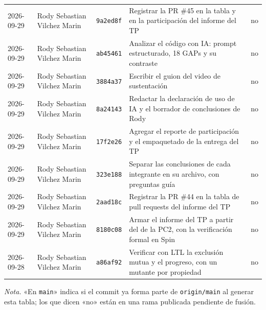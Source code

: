 {\begin{xltabular}{\textwidth}{@{}L{1.9cm}L{2.7cm}L{1.4cm}Yc@{}}
2026-09-29 & Rody Sebastian Vilchez Marin & \texttt{9a2ed8f} & Registrar la PR \#45 en la tabla y en la participación del informe del TP & no \\
2026-09-29 & Rody Sebastian Vilchez Marin & \texttt{ab45461} & Analizar el código con IA: prompt estructurado, 18 GAPs y su contraste & no \\
2026-09-29 & Rody Sebastian Vilchez Marin & \texttt{3884a37} & Escribir el guion del video de sustentación & no \\
2026-09-29 & Rody Sebastian Vilchez Marin & \texttt{8a24143} & Redactar la declaración de uso de IA y el borrador de conclusiones de Rody & no \\
2026-09-29 & Rody Sebastian Vilchez Marin & \texttt{17f2e26} & Agregar el reporte de participación y el empaquetado de la entrega del TP & no \\
2026-09-29 & Rody Sebastian Vilchez Marin & \texttt{323e188} & Separar las conclusiones de cada integrante en su archivo, con preguntas guía & no \\
2026-09-29 & Rody Sebastian Vilchez Marin & \texttt{2aad18c} & Registrar la PR \#44 en la tabla de pull requests del informe del TP & no \\
2026-09-29 & Rody Sebastian Vilchez Marin & \texttt{8180c08} & Armar el informe del TP a partir del de la PC2, con la verificación formal en Spin & no \\
2026-09-28 & Rody Sebastian Vilchez Marin & \texttt{a86af92} & Verificar con LTL la exclusión mutua y el progreso, con un mutante por propiedad & no \\
\end{xltabular}
}

{\footnotesize\textit{Nota.} «En \texttt{main}» indica si el commit ya forma parte de \texttt{origin/main} al generar esta tabla; los que dicen «no» están en una rama publicada pendiente de fusión.\par}
